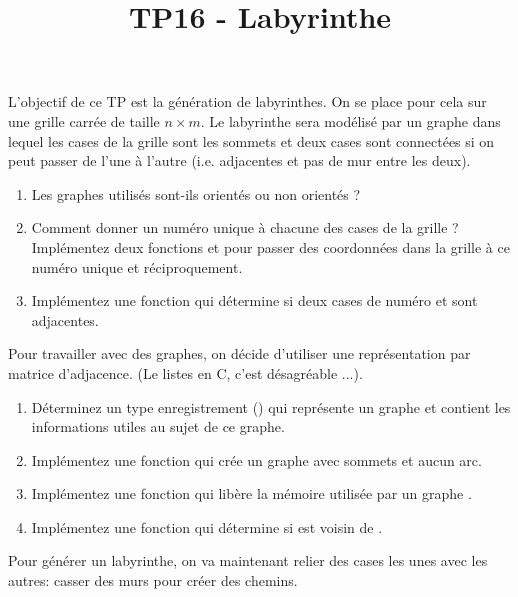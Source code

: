 \documentclass[a4paper, 10pt]{article}
\title{TP16 - Labyrinthe}
\begin{document}
\maketitle
L'objectif de ce TP est la génération de labyrinthes. On se place pour cela sur une grille carrée de taille \(n\times m\). Le labyrinthe sera modélisé par un graphe dans lequel les cases de la grille sont les sommets et deux cases sont connectées si on peut passer de l'une à l'autre (i.e. adjacentes et pas de mur entre les deux).
\begin{enumerate}
\item Les graphes utilisés sont-ils orientés ou non orientés ?
\item Comment donner un numéro unique à chacune des cases de la grille ? Implémentez deux fonctions  et  pour passer des coordonnées dans la grille à ce numéro unique et réciproquement.
\item Implémentez une fonction  qui détermine si deux cases de numéro  et  sont adjacentes.
\end{enumerate}
Pour travailler avec des graphes, on décide d'utiliser une représentation par matrice d'adjacence. (Le listes en C, c'est désagréable ...).
\begin{enumerate}[resume]
\item Déterminez un type enregistrement () qui représente un graphe et contient les informations utiles au sujet de ce graphe.
\item Implémentez une fonction  qui crée un graphe avec  sommets et aucun arc.
\item Implémentez une fonction  qui libère la mémoire utilisée par un graphe .
\item Implémentez une fonction  qui détermine si  est voisin de .
\end{enumerate}
Pour générer un labyrinthe, on va maintenant relier des cases les unes avec les autres: casser des murs pour créer des chemins.
\end{document}
